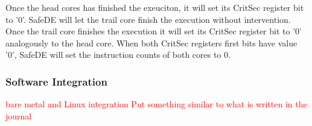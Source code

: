 Once the head cores has finished the exeuciton, it will set its CritSec register bit to '0'. SafeDE will let the trail core finish the execution without intervention. Once the trail core finishes the execution it will set its CritSec register bit to '0' analogously to the head core. When both CritSec registers first bits have value '0', SafeDE will set the instruction counts of both cores to 0.
\bigskip

\subsubsection{Software Integration}
\label{section:software_integration}
\textcolor{red}{bare metal and Linux integration}
\textcolor{red}{Put something similar to what is written in the journal}
\bigskip
